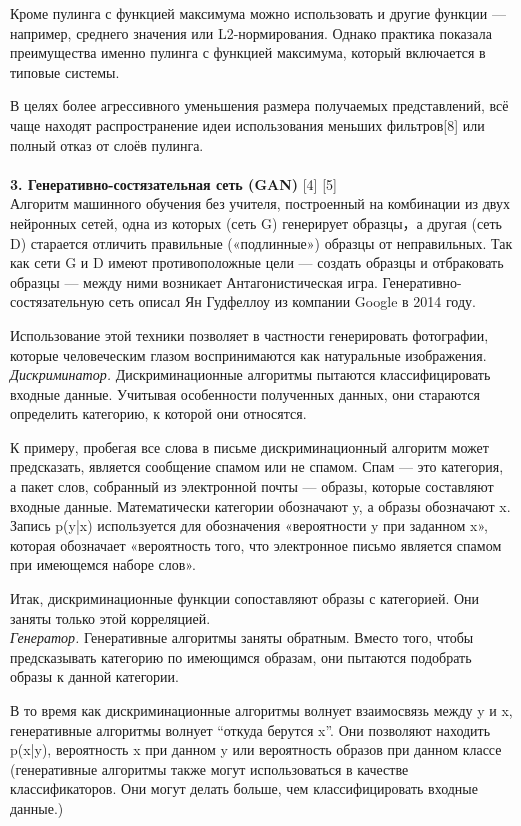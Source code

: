 \documentclass{article}
\begin{document}
Кроме пулинга с функцией максимума можно использовать и другие функции — например, среднего значения или L2-нормирования. Однако практика показала преимущества именно пулинга с функцией максимума, который включается в типовые системы.

В целях более агрессивного уменьшения размера получаемых представлений, всё чаще находят распространение идеи использования меньших фильтров[8] или полный отказ от слоёв пулинга. \\ \\
    \textbf{3. Генеративно-состязательная сеть (GAN)} [4] [5]\\
    Алгоритм машинного обучения без учителя, построенный на комбинации из двух нейронных сетей, одна из которых (сеть G) генерирует образцы，а другая (сеть D) старается отличить правильные («подлинные») образцы от неправильных. Так как сети G и D имеют противоположные цели — создать образцы и отбраковать образцы — между ними возникает Антагонистическая игра. Генеративно-состязательную сеть описал Ян Гудфеллоу из компании Google в 2014 году.

    Использование этой техники позволяет в частности генерировать фотографии, которые человеческим глазом воспринимаются как натуральные изображения. \\
    
\textit{Дискриминатор. }Дискриминационные алгоритмы пытаются классифицировать входные данные. Учитывая особенности полученных данных, они стараются определить категорию, к которой они относятся.

К примеру, пробегая все слова в письме дискриминационный алгоритм может предсказать, является сообщение спамом или не спамом. Спам — это категория, а пакет слов, собранный из электронной почты — образы, которые составляют входные данные. Математически категории обозначают y, а образы обозначают x. Запись p(y|x) используется для обозначения «вероятности y при заданном x», которая обозначает «вероятность того, что электронное письмо является спамом при имеющемся наборе слов».

Итак, дискриминационные функции сопоставляют образы с категорией. Они заняты только этой корреляцией. \\

\textit{Генератор. }Генеративные алгоритмы заняты обратным. Вместо того, чтобы предсказывать категорию по имеющимся образам, они пытаются подобрать образы к данной категории.

В то время как дискриминационные алгоритмы волнует взаимосвязь между y и x, генеративные алгоритмы волнует “откуда берутся x”. Они позволяют находить p(x|y), вероятность x при данном y или вероятность образов при данном классе (генеративные алгоритмы также могут использоваться в качестве классификаторов. Они могут делать больше, чем классифицировать входные данные.)
\end{document}

